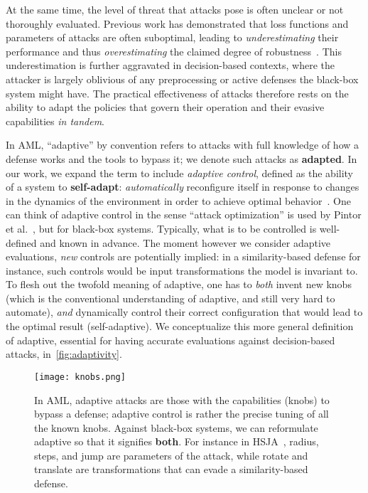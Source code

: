 At the same time, the level of threat that attacks pose is often unclear or not thoroughly evaluated.
Previous work has demonstrated that loss functions and parameters of attacks are often suboptimal, leading to \textit{underestimating} their performance and thus \textit{overestimating} the claimed degree of robustness~\cite{croce2020reliable, pintor2022indicators}.
This underestimation is further aggravated in decision-based contexts, where the attacker is largely oblivious of any preprocessing or active defenses the black-box system might have.
The practical effectiveness of attacks therefore rests on the ability to adapt the policies that govern their operation and their evasive capabilities \textit{in tandem}.

In \gls{AML}, ``adaptive'' by convention refers to attacks with full knowledge of how a defense works and the tools to bypass it; we denote such attacks as \textbf{adapted}.
In our work, we expand the term to include \textit{adaptive control}, defined as the ability of a system to \textbf{self-adapt}: \emph{automatically} reconfigure itself in response to changes in the dynamics of the environment in order to achieve optimal behavior~\cite{aastrom2013adaptive}.
One can think of adaptive control in the sense ``attack optimization'' is used by Pintor et al.~\cite{pintor2022indicators}, but for black-box systems.
Typically, what is to be controlled is well-defined and known in advance.
The moment however we consider adaptive evaluations, \textit{new} controls are potentially implied: in a similarity-based defense for instance, such controls would be input transformations the model is invariant to.
To flesh out the twofold meaning of adaptive, one has to \textit{both} invent new knobs~\cite{hofstadter2008metamagical} (which is the conventional understanding of adaptive, and still very hard to automate), \textit{and} dynamically control their correct configuration that would lead to the optimal result (self-adaptive).
We conceptualize this more general definition of adaptive, essential for having accurate evaluations against decision-based attacks, in~\autoref{fig:adaptivity}.

\begin{figure}
  \centering
  \texttt{[image: knobs.png]}
  \caption[Adaptive attacks reformulation.]{In \gls{AML}, adaptive attacks are those with the capabilities (knobs) to bypass a defense; adaptive control is rather the precise tuning of all the known knobs. Against black-box systems, we can reformulate adaptive so that it signifies \textbf{both}. For instance in HSJA~\cite{chen2020hopskipjumpattack}, radius, steps, and jump are parameters of the attack, while rotate and translate are transformations that can evade a similarity-based defense.}
  \label{fig:adaptivity}
\end{figure}

